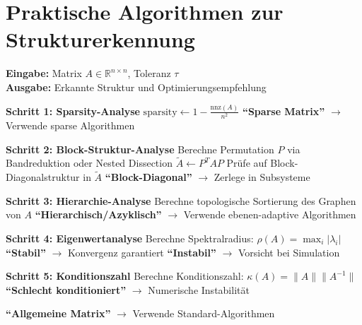 ﻿\documentclass[a4paper,12pt]{report}
\theoremstyle{definition}
\begin{document}
	\section{Praktische Algorithmen zur Strukturerkennung}
	
	\begin{algorithm}[H]
		\caption{Automatische Strukturerkennung}
		\label{alg:structure-detection}
		\textbf{Eingabe:} Matrix $A \in \mathbb{R}^{n \times n}$, Toleranz $\tau$ \\
		\textbf{Ausgabe:} Erkannte Struktur und Optimierungsempfehlung
		\begin{algorithmic}[1]
			\State \textbf{Schritt 1: Sparsity-Analyse}
			\State $\text{sparsity} \gets 1 - \frac{\text{nnz}(A)}{n^2}$
			\State \Return \textbf{``Sparse Matrix''} $\rightarrow$ Verwende sparse Algorithmen
			\EndIf
			
			\State \textbf{Schritt 2: Block-Struktur-Analyse}
			\State Berechne Permutation $P$ via Bandreduktion oder Nested Dissection
			\State $\tilde{A} \gets P^T A P$
			\State Prüfe auf Block-Diagonalstruktur in $\tilde{A}$
			\State \Return \textbf{``Block-Diagonal''} $\rightarrow$ Zerlege in Subsysteme
			\EndIf
			
			\State \textbf{Schritt 3: Hierarchie-Analyse}
			\State Berechne topologische Sortierung des Graphen von $A$
			\State \Return \textbf{``Hierarchisch/Azyklisch''} $\rightarrow$ Verwende ebenen-adaptive Algorithmen
			\EndIf
			
			\State \textbf{Schritt 4: Eigenwertanalyse}
			\State Berechne Spektralradius: $\rho(A) = \max_i |\lambda_i|$
			\State \Return \textbf{``Stabil''} $\rightarrow$ Konvergenz garantiert
			\Else
			\State \Return \textbf{``Instabil''} $\rightarrow$ Vorsicht bei Simulation
			\EndIf
			
			\State \textbf{Schritt 5: Konditionszahl}
			\State Berechne Konditionszahl: $\kappa(A) = \|A\| \|A^{-1}\|$
			\State \Return \textbf{``Schlecht konditioniert''} $\rightarrow$ Numerische Instabilität
			\EndIf
			
			\State \Return \textbf{``Allgemeine Matrix''} $\rightarrow$ Verwende Standard-Algorithmen
		\end{algorithmic}
	\end{algorithm}
	
\end{document}
